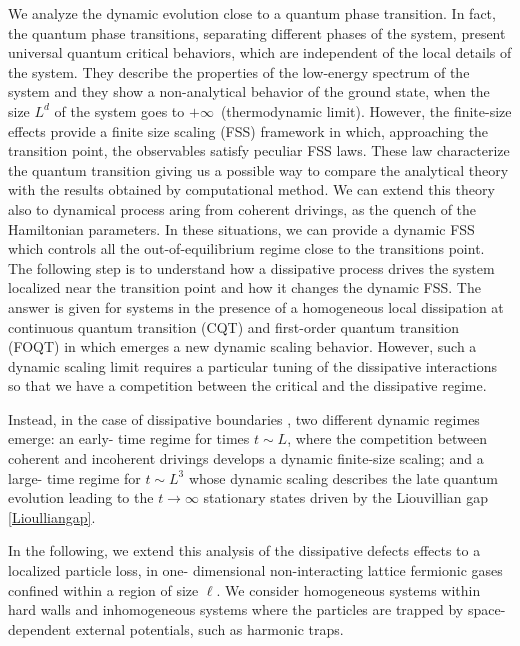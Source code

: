 We analyze the dynamic evolution close to a quantum phase transition. In fact, the quantum phase transitions, separating different phases of the system, present universal quantum critical behaviors, which are independent of the local details of the system. They describe the properties of the low-energy spectrum of the system and they show a non-analytical behavior of the ground state, when the size $L^d$ of the system goes to $+\infty\,$ (thermodynamic limit). However, the finite-size effects provide a finite size scaling (FSS) framework in which, approaching the transition point, the observables satisfy peculiar FSS laws. These law characterize the quantum transition giving us a possible way to compare the analytical theory with the results obtained by computational method. We can extend this theory also to dynamical process aring from coherent drivings, as the quench of the Hamiltonian parameters. In these situations, we can provide a dynamic FSS which controls all the out-of-equilibrium regime close to the transitions point. The following step is to understand how a dissipative process drives the system localized near the transition point and how it changes the dynamic FSS. The answer is given for systems in the presence of a homogeneous local dissipation at continuous quantum transition (CQT) \cite{NRV-2019-competingdissipativeandcoherent} and first-order quantum transition (FOQT) \cite{di2020dissipative} in which emerges a new dynamic scaling behavior. However, such a dynamic scaling limit requires a particular tuning of the dissipative interactions so that we have a competition between the critical and the dissipative regime. 

Instead, in the case of dissipative boundaries 
\cite{TV-2021-dissipativeboundaries}, two different dynamic regimes emerge: an early-
time regime for times $t \sim L$, where the competition between coherent and incoherent drivings
develops a dynamic finite-size scaling; and a large-
time regime for $t \sim L^3$ whose dynamic scaling describes the late quantum evolution leading to the
$t \to \infty$ stationary states driven by the Liouvillian gap \eqref{Lioulliangap}.

In the following, we extend this analysis of the dissipative defects effects to a localized particle loss, in one-
dimensional non-interacting lattice fermionic gases confined within a region of size $\ell$. We consider
homogeneous systems within hard walls and inhomogeneous systems where the particles are trapped
by space-dependent external potentials, such as harmonic traps.

